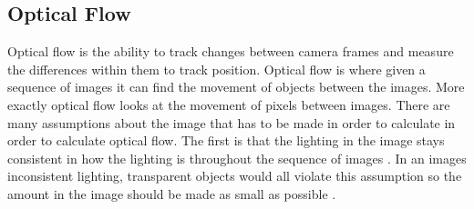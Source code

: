 \documentclass{article}
\begin{document}


  \subsection{Optical Flow}
	Optical flow is the ability to track changes between camera frames and measure the differences within them to track position. Optical flow is where given a sequence of images it can find the movement of objects between the images. More exactly optical flow looks at the movement of pixels between images. There are many assumptions about the image that has to be made in order to calculate in order to calculate optical flow. The first is that the lighting in the image stays consistent in how the lighting is throughout the sequence of images  \cite{odonovan_optical_2005}. In an images inconsistent lighting, transparent objects would all violate this assumption so the amount in the image should be made as small as possible \cite{odonovan_optical_2005}.
\end{document}
